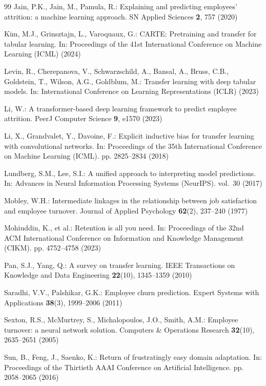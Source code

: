 \documentclass[runningheads]{llncs}
\begin{document}
\begin{thebibliography}{99}
Jain, P.K., Jain, M., Pamula, R.: Explaining and predicting employees' attrition: a machine learning approach. SN Applied Sciences \textbf{2}, 757 (2020)

Kim, M.J., Grinsztajn, L., Varoquaux, G.: CARTE: Pretraining and transfer for tabular learning. In: Proceedings of the 41st International Conference on Machine Learning (ICML) (2024)

Levin, R., Cherepanova, V., Schwarzschild, A., Bansal, A., Bruss, C.B., Goldstein, T., Wilson, A.G., Goldblum, M.: Transfer learning with deep tabular models. In: International Conference on Learning Representations (ICLR) (2023)

Li, W.: A transformer-based deep learning framework to predict employee attrition. PeerJ Computer Science \textbf{9}, e1570 (2023)

Li, X., Grandvalet, Y., Davoine, F.: Explicit inductive bias for transfer learning with convolutional networks. In: Proceedings of the 35th International Conference on Machine Learning (ICML). pp. 2825--2834 (2018)

Lundberg, S.M., Lee, S.I.: A unified approach to interpreting model predictions. In: Advances in Neural Information Processing Systems (NeurIPS). vol.~30 (2017)

Mobley, W.H.: Intermediate linkages in the relationship between job satisfaction and employee turnover. Journal of Applied Psychology \textbf{62}(2), 237--240 (1977)

Mohiuddin, K., et al.: Retention is all you need. In: Proceedings of the 32nd ACM International Conference on Information and Knowledge Management (CIKM). pp. 4752--4758 (2023)

Pan, S.J., Yang, Q.: A survey on transfer learning. IEEE Transactions on Knowledge and Data Engineering \textbf{22}(10), 1345--1359 (2010)

Saradhi, V.V., Palshikar, G.K.: Employee churn prediction. Expert Systems with Applications \textbf{38}(3), 1999--2006 (2011)

Sexton, R.S., McMurtrey, S., Michalopoulos, J.O., Smith, A.M.: Employee turnover: a neural network solution. Computers \& Operations Research \textbf{32}(10), 2635--2651 (2005)

Sun, B., Feng, J., Saenko, K.: Return of frustratingly easy domain adaptation. In: Proceedings of the Thirtieth AAAI Conference on Artificial Intelligence. pp. 2058--2065 (2016)


\end{thebibliography}
\end{document}
